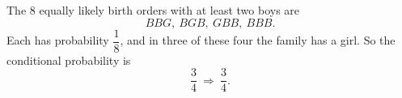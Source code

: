 The $8$ equally likely birth orders with at least two boys are
\[
BBG,\ BGB,\ GBB,\ BBB .
\]
Each has probability $\dfrac{1}{8}$, and in three of these four the family has a girl. So the conditional probability is
\[
\dfrac{3}{4}\ \Longrightarrow\ \boxed{\dfrac{3}{4}} .
\]
